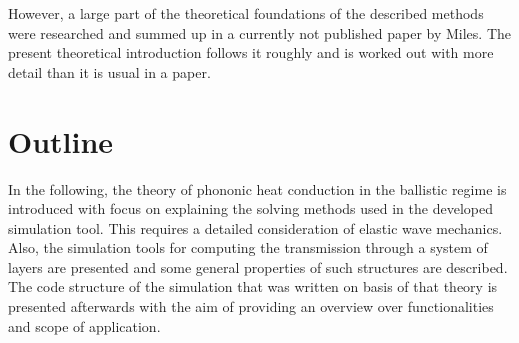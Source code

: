 However, a large part of the theoretical foundations of the described methods
were researched and summed up in a currently not published paper by Miles. The
present theoretical introduction follows it roughly and is worked out with more
detail than it is usual in a paper.

\section{Outline}
In the following, the theory of phononic heat conduction in the ballistic
regime is introduced with focus on explaining the solving methods used in the
developed simulation tool. This requires a detailed consideration of elastic
wave mechanics. Also, the simulation tools for computing the transmission
through a system of layers are presented and some general properties of such
structures are described.
The code structure of the simulation that was written on basis of
that theory is presented afterwards with the aim of providing an overview over
functionalities and scope of application.